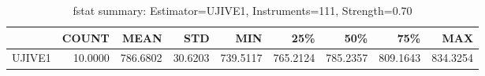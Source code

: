 \begin{table}[ht]
\centering
\caption{fstat summary: Estimator=UJIVE1, Instruments=111, Strength=0.70}
\begin{tabular}{lrrrrrrrr}
\toprule
 & COUNT & MEAN & STD & MIN & 25\% & 50\% & 75\% & MAX \\
\midrule
UJIVE1 & 10.0000 & 786.6802 & 30.6203 & 739.5117 & 765.2124 & 785.2357 & 809.1643 & 834.3254 \\
\bottomrule
\end{tabular}
\end{table}

